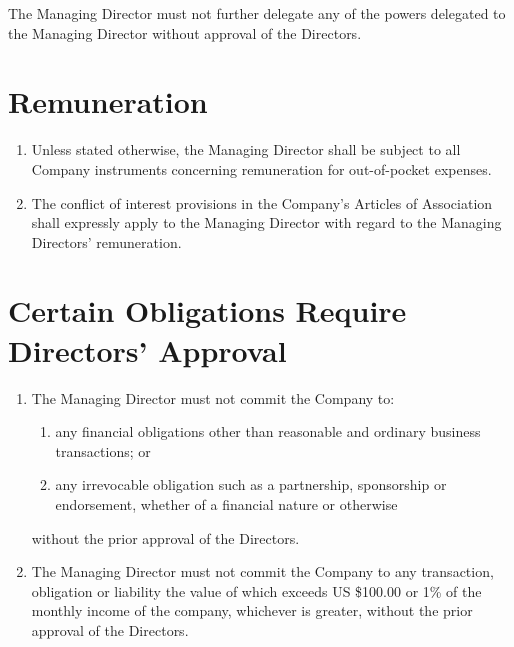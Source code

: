 \documentclass[a4paper,10pt]{article}
\begin{document}
The Managing Director must not further delegate any of the powers delegated to the Managing Director without approval of the Directors.


\section{Remuneration}

\begin{enumerate}
    \item Unless stated otherwise, the Managing Director shall be subject to all Company instruments concerning remuneration for out-of-pocket expenses.
    \item The conflict of interest provisions in the Company's Articles of Association shall expressly apply to the Managing Director with regard to the Managing Directors' remuneration.
\end{enumerate}

\section{Certain Obligations Require Directors' Approval}

\begin{enumerate}
    \item The Managing Director must not commit the Company to:
    \begin{enumerate}
        \item any financial obligations other than reasonable and ordinary business transactions; or
        \item any irrevocable obligation such as a partnership, sponsorship or endorsement, whether of a financial nature or otherwise
    \end{enumerate}
        without the prior approval of the Directors.
    \item The Managing Director must not commit the Company to any transaction, obligation or liability the value of which exceeds US \$100.00 or 1\% of the monthly income of the company, whichever is greater, without the prior approval of the Directors.
\end{enumerate}

\setcounter{section}{0}

\renewcommand{\thesection}{Schedule \arabic{section}}
\end{document}
